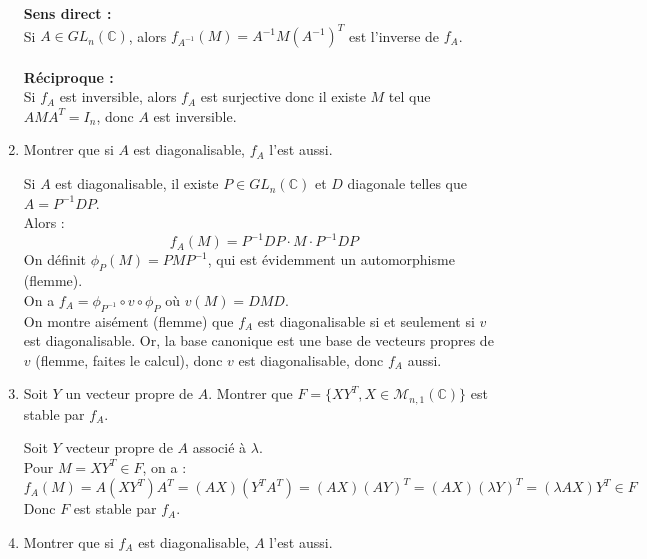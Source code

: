 \documentclass[a4paper,12pt]{article}
\begin{document}
\begin{enumerate}
        \begin{correctionbox}
        \textbf{Sens direct :} \\
        Si \(A \in GL_n(\mathbb{C})\), alors \(f_{A^{-1}}(M) = A^{-1}M(A^{-1})^T\) est l'inverse de \(f_A\). \\\\ \textbf{Réciproque :} \\
        Si \(f_A\) est inversible, alors \(f_A\) est surjective donc il existe \(M\) tel que \(AMA^T = I_n\), donc \(A\) est inversible.
        \end{correctionbox}
        
        \item Montrer que si \(A\) est diagonalisable, \(f_A\) l'est aussi.
        
        \begin{correctionbox}
        Si \(A\) est diagonalisable, il existe \(P \in GL_n(\mathbb{C})\) et \(D\) diagonale telles que \(A = P^{-1}DP\). \\
        Alors :
        \[
        f_A(M) = P^{-1}DP \cdot M \cdot P^{-1}DP
        \]
        On définit \(\phi_P(M) = PMP^{-1}\), qui est évidemment un automorphisme (flemme). \\
        On a \(f_A = \phi_{P^{-1}} \circ v \circ \phi_P\) où \(v(M) = DMD\). \\

        On montre aisément (flemme) que \(f_A\) est diagonalisable si et seulement si $v$ est diagonalisable.
        Or, la base canonique est une base de vecteurs propres de \(v\) (flemme, faites le calcul), donc \(v\) est diagonalisable, donc \(f_A\) aussi.
        \end{correctionbox}
        
        \item Soit \(Y\) un vecteur propre de \(A\). Montrer que \(F = \{XY^T, X \in \mathcal{M}_{n,1}(\mathbb{C})\}\) est stable par \(f_A\).
        
        \begin{correctionbox}
        Soit \(Y\) vecteur propre de \(A\) associé à \(\lambda\). \\
        Pour \(M = XY^T \in F\), on a :
        \[
        f_A(M) = A(XY^T)A^T = (AX)(Y^TA^T) = (AX)(AY)^T= (AX)(\lambda Y)^T = (\lambda AX)Y^T \in F
        \]
        Donc \(F\) est stable par \(f_A\).
        \end{correctionbox}
        
        \item Montrer que si \(f_A\) est diagonalisable, \(A\) l'est aussi.


\end{enumerate}
\end{document}
